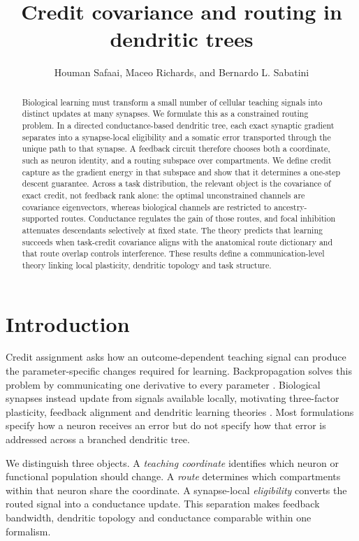\documentclass[11pt]{article}
\title{Credit covariance and routing in dendritic trees}
\author{Houman Safaai, Maceo Richards, and Bernardo L. Sabatini}
\date{}
\begin{document}
\maketitle

\begin{abstract}
Biological learning must transform a small number of cellular teaching signals
into distinct updates at many synapses. We formulate this as a constrained
routing problem. In a directed conductance-based dendritic tree, each exact
synaptic gradient separates into a synapse-local eligibility and a somatic
error transported through the unique path to that synapse. A feedback circuit
therefore chooses both a coordinate, such as neuron identity, and a routing
subspace over compartments. We define credit capture as the gradient energy in
that subspace and show that it determines a one-step descent guarantee. Across
a task distribution, the relevant object is the covariance of exact credit,
not feedback rank alone: the optimal unconstrained channels are covariance
eigenvectors, whereas biological channels are restricted to ancestry-supported
routes. Conductance regulates the gain of those routes, and focal inhibition
attenuates descendants selectively at fixed state. The theory predicts that
learning succeeds when task-credit covariance aligns with the anatomical route
dictionary and that route overlap controls interference. These results define
a communication-level theory linking local plasticity, dendritic topology and
task structure.
\end{abstract}

\section{Introduction}

Credit assignment asks how an outcome-dependent teaching signal can produce
the parameter-specific changes required for learning. Backpropagation solves
this problem by communicating one derivative to every parameter
\citep{rumelhart1986learning}. Biological synapses instead update from signals
available locally, motivating three-factor plasticity, feedback alignment and
dendritic learning theories
\citep{fremaux2016threefactor,richards2019dendritic,lillicrap2020backprop}.
Most formulations specify how a neuron receives an error but do not specify
how that error is addressed across a branched dendritic tree.

We distinguish three objects. A \emph{teaching coordinate} identifies which
neuron or functional population should change. A \emph{route} determines which
compartments within that neuron share the coordinate. A synapse-local
\emph{eligibility} converts the routed signal into a conductance update. This
separation makes feedback bandwidth, dendritic topology and conductance
comparable within one formalism.
\end{document}
